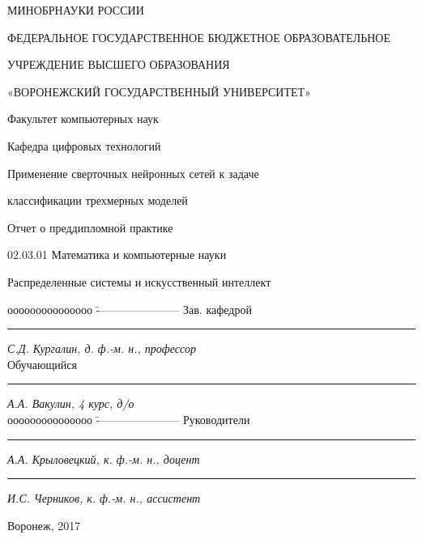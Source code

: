 \documentclass[14pt]{article}
\numberwithin{figure}{section}
\numberwithin{equation}{section}
\begin{document}
\begin{titlepage}

\thispagestyle{empty}

\centerline{МИНОБРНАУКИ РОССИИ}
\centerline{ФЕДЕРАЛЬНОЕ ГОСУДАРСТВЕННОЕ БЮДЖЕТНОЕ ОБРАЗОВАТЕЛЬНОЕ}
\centerline{УЧРЕЖДЕНИЕ ВЫСШЕГО ОБРАЗОВАНИЯ}
\centerline{«ВОРОНЕЖСКИЙ ГОСУДАРСТВЕННЫЙ УНИВЕРСИТЕТ»}

\vspace{0.3cm}

\centerline{Факультет компьютерных наук}
\centerline{Кафедра цифровых технологий}

\vspace{1cm}

\centerline{Применение сверточных нейронных сетей к задаче }
\centerline{классификации трехмерных моделей}

\vspace{1cm}

\centerline{Отчет о преддипломной практике}
\centerline{02.03.01 Математика и компьютерные науки}
\centerline{Распределенные системы и искусственный интеллект}

\vfill

\begin{tabbing}
ооооооооооооооо	\=	----------------------	\kill
Зав. кафедрой	\> 	\rule[0mm]{4cm}{0,3mm}	\textit{С.Д. Кургалин, д. ф.-м. н., профессор} \\
Обучающийся 	\> 	\rule[0mm]{4cm}{0,3mm}	\textit{А.А. Вакулин, 4 курс, д/о}             \\
ооооооооооооооо	\=	----------------------	\kill
Руководители	\> 	\rule[0mm]{4cm}{0,3mm}  \textit{А.А. Крыловецкий, к. ф.-м. н., доцент} \\
				\> 	\rule[0mm]{4cm}{0,3mm}  \textit{И.С. Черников, к. ф.-м. н., ассистент}
\end{tabbing}

\vfill

\centerline{Воронеж, 2017}
\clearpage
\end{titlepage}
\end{document}
